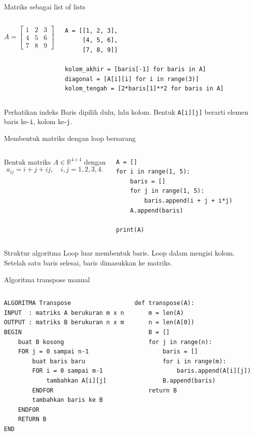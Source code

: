 \documentclass[aspectratio=169,11pt]{beamer}
\begin{document}
\begin{frame}[fragile]{Matriks sebagai list of lists}
\begin{columns}[T]
\[
A=\begin{bmatrix}
1&2&3\\
4&5&6\\
7&8&9
\end{bmatrix}
\]
\begin{lstlisting}
A = [[1, 2, 3],
     [4, 5, 6],
     [7, 8, 9]]

kolom_akhir = [baris[-1] for baris in A]
diagonal = [A[i][i] for i in range(3)]
kolom_tengah = [2*baris[1]**2 for baris in A]
\end{lstlisting}
\end{columns}
\begin{block}{Perhatikan indeks}
Baris dipilih dulu, lalu kolom. Bentuk \texttt{A[i][j]} berarti elemen baris ke-\texttt{i}, kolom ke-\texttt{j}.
\end{block}
\end{frame}

\begin{frame}[fragile]{Membentuk matriks dengan loop bersarang}
\begin{columns}[T]
Bentuk matriks $A\in\mathbb{R}^{4\times4}$ dengan
\[
a_{ij}=i+j+ij,\quad i,j=1,2,3,4.
\]
\begin{lstlisting}
A = []
for i in range(1, 5):
    baris = []
    for j in range(1, 5):
        baris.append(i + j + i*j)
    A.append(baris)

print(A)
\end{lstlisting}
\end{columns}
\begin{block}{Struktur algoritma}
Loop luar membentuk baris. Loop dalam mengisi kolom. Setelah satu baris selesai, baris dimasukkan ke matriks.
\end{block}
\end{frame}

\begin{frame}[fragile]{Algoritma transpose manual}
\begin{columns}[T]
\begin{lstlisting}[language={}]
ALGORITMA Transpose
INPUT  : matriks A berukuran m x n
OUTPUT : matriks B berukuran n x m
BEGIN
    buat B kosong
    FOR j = 0 sampai n-1
        buat baris baru
        FOR i = 0 sampai m-1
            tambahkan A[i][j]
        ENDFOR
        tambahkan baris ke B
    ENDFOR
    RETURN B
END
\end{lstlisting}
\begin{lstlisting}
def transpose(A):
    m = len(A)
    n = len(A[0])
    B = []
    for j in range(n):
        baris = []
        for i in range(m):
            baris.append(A[i][j])
        B.append(baris)
    return B
\end{lstlisting}
\end{columns}
\end{frame}
\end{document}
